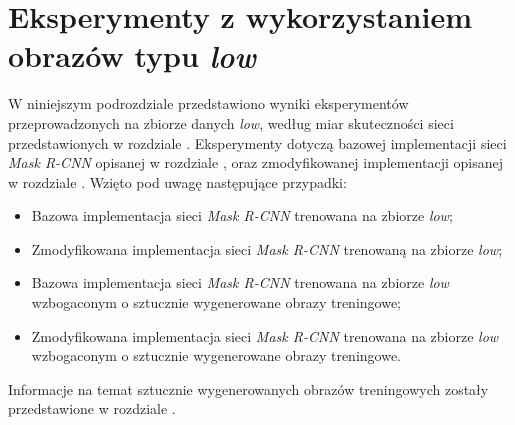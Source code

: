 \section{Eksperymenty z wykorzystaniem obrazów typu \textit{low}}
W niniejszym podrozdziale przedstawiono wyniki eksperymentów przeprowadzonych na zbiorze danych \textit{low}, według miar skuteczności sieci przedstawionych w rozdziale .
Eksperymenty dotyczą bazowej implementacji sieci \textit{Mask R-CNN} \cite{matterport-mask-rcnn} opisanej w rozdziale , oraz zmodyfikowanej implementacji opisanej w rozdziale .
 Wzięto pod uwagę następujące przypadki:

\begin{itemize}
 \item Bazowa implementacja sieci \textit{Mask R-CNN} trenowana na zbiorze \textit{low};
 \item Zmodyfikowana implementacja sieci \textit{Mask R-CNN} trenowaną na zbiorze \textit{low};
 \item Bazowa implementacja sieci \textit{Mask R-CNN} trenowana na zbiorze \textit{low} wzbogaconym o sztucznie wygenerowane obrazy treningowe;
 \item Zmodyfikowana implementacja sieci \textit{Mask R-CNN} trenowana na zbiorze \textit{low} wzbogaconym o sztucznie wygenerowane obrazy treningowe.
\end{itemize}

Informacje na temat sztucznie wygenerowanych obrazów treningowych zostały przedstawione w rozdziale .
